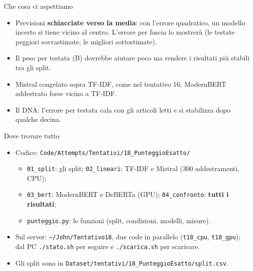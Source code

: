 \documentclass[aspectratio=169]{beamer}
\newcommand{\hl}[1]{\textbf{#1}}
\begin{document}
\begin{frame}{Che cosa ci aspettiamo}
  \vfill
  \begin{itemize}
    \setlength\itemsep{0.8em}
    \item Previsioni \hl{schiacciate verso la media}: con l'errore quadratico, un modello incerto si tiene vicino al centro.
          L'errore per fascia lo mostrer\`a (le testate peggiori sovrastimate, le migliori sottostimate).
    \item Il peso per testata (B) dovrebbe aiutare poco ma rendere i risultati pi\`u stabili tra gli split.
    \item Mistral congelato sopra TF-IDF, come nel tentativo 16; ModernBERT addestrato forse vicino a TF-IDF.
    \item Il DNA: l'errore per testata cala con gli articoli letti e si stabilizza dopo qualche decina.
  \end{itemize}
  \vfill
\end{frame}

\begin{frame}{Dove trovare tutto}
  \vfill
  \small
  \begin{itemize}
    \setlength\itemsep{0.6em}
    \item Codice: \texttt{Code/Attempts/Tentativi/18\_PunteggioEsatto/}
      \begin{itemize}
        \item \texttt{01\_split}: gli split; \texttt{02\_lineari}: TF-IDF e Mistral (300 addestramenti, CPU);
        \item \texttt{03\_bert}: ModernBERT e DeBERTa (GPU); \texttt{04\_confronto}: \hl{tutti i risultati};
        \item \texttt{punteggio.py}: le funzioni (split, condizioni, modelli, misure).
      \end{itemize}
    \item Sul server: \texttt{\~{}/John/Tentativo18}, due code in parallelo (\texttt{t18\_cpu}, \texttt{t18\_gpu}); dal PC
          \texttt{./stato.sh} per seguire e \texttt{./scarica.sh} per scaricare.
    \item Gli split sono in \texttt{Dataset/tentativi/18\_PunteggioEsatto/split.csv}.
  \end{itemize}
  \vfill
\end{frame}
\end{document}
